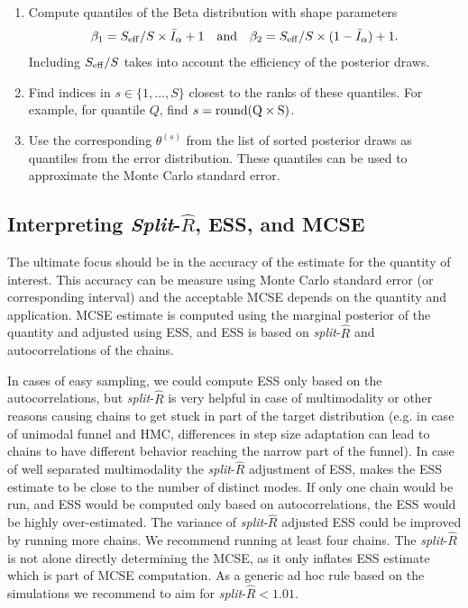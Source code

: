 \documentclass[american,]{article}
\begin{document}
\begin{enumerate}
\def\labelenumi{\arabic{enumi}.}
\item
  Compute quantiles of the Beta distribution with shape parameters
  \begin{equation}
  \beta_1 = S_{\rm eff} / S \times \bar{I}_\alpha+1 \quad \text{and} \quad
  \beta_2 = S_{\rm eff} / S \times (1-\bar{I}_\alpha) + 1.
  \end{equation} Including \(S_{\rm eff}/S\) takes into account the
  efficiency of the posterior draws.
\item
  Find indices in \(s \in \{1,\ldots,S\}\) closest to the ranks of these
  quantiles. For example, for quantile \(Q\), find
  \(s = {\rm round(Q \times S)}\).
\item
  Use the corresponding \(\theta^{(s)}\) from the list of sorted
  posterior draws as quantiles from the error distribution. These
  quantiles can be used to approximate the Monte Carlo standard error.
\end{enumerate}

\hypertarget{warning-thresholds}{%
\subsection{Interpreting \texorpdfstring{\emph{Split}-\(\widehat{R}\)}{Split-\textbackslash{}widehat\{R\}}, ESS, and MCSE}\label{warning-thresholds}}

The ultimate focus should be in the accuracy of the estimate for the
quantity of interest. This accuracy can be measure using Monte Carlo
standard error (or corresponding interval) and the acceptable MCSE
depends on the quantity and application. MCSE estimate is computed
using the marginal posterior of the quantity and adjusted using ESS,
and ESS is based on \emph{split}-\(\widehat{R}\) and autocorrelations
of the chains.

In cases of easy sampling, we could compute ESS only based on the
autocorrelations, but \emph{split}-\(\widehat{R}\) is very helpful in
case of multimodality or other reasons causing chains to get stuck in
part of the target distribution (e.g. in case of unimodal funnel and
HMC, differences in step size adaptation can lead to chains to have
different behavior reaching the narrow part of the funnel). In case of
well separated multimodality the \emph{split}-\(\widehat{R}\)
adjustment of ESS, makes the ESS estimate to be close to the number of
distinct modes. If only one chain would be run, and ESS would be
computed only based on autocorrelations, the ESS would be highly
over-estimated. The variance of \emph{split}-\(\widehat{R}\) adjusted
ESS could be improved by running more chains. We recommend running at
least four chains. The \emph{split}-\(\widehat{R}\) is not alone
directly determining the MCSE, as it only inflates ESS estimate which
is part of MCSE computation. As a generic ad hoc rule based on the
simulations we recommend to aim for \emph{split}-\(\widehat{R}<1.01\).
\end{document}
